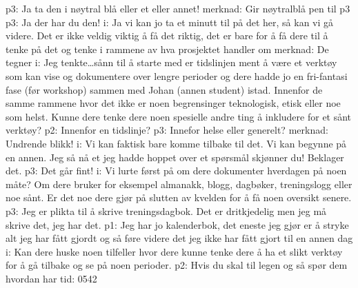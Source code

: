 \documentclass[11pt,UKenglish, a4paper]{article}
\begin{document}
p3: Ja ta den i nøytral blå eller et eller annet!
merknad: Gir nøytralblå pen til p3
p3: Ja der har du den!
i: Ja vi kan jo ta et minutt til på det her, så kan vi gå videre. Det er ikke veldig viktig å få det riktig, det er bare for å få dere til å tenke på det og tenke i rammene av hva prosjektet handler om
merknad: De tegner
i: Jeg tenkte\dots sånn til å starte med er tidslinjen ment å være et verktøy som kan vise og dokumentere over lengre perioder og dere hadde jo en fri-fantasi fase (før workshop) sammen med Johan (annen student) istad. Innenfor de samme rammene hvor det ikke er noen begrensinger teknologisk, etisk eller noe som helst. Kunne dere tenke dere noen spesielle andre ting å inkludere for et sånt verktøy? 
p2: Innenfor en tidslinje?
p3: Innefor helse eller generelt?
merknad: Undrende blikk!
i: Vi kan faktisk bare komme tilbake til det. Vi kan begynne på en annen. Jeg så nå et jeg hadde hoppet over et spørsmål skjønner du! Beklager det. 
p3: Det går fint!
i: Vi lurte først på om dere dokumenter hverdagen på noen måte? Om dere bruker for eksempel almanakk, blogg, dagbøker, treningslogg eller noe sånt. Er det noe dere gjør på slutten av kvelden for å få noen oversikt senere.
p3: Jeg er plikta til å skrive treningsdagbok. Det er dritkjedelig men jeg må skrive det, jeg har det.
p1: Jeg har jo kalenderbok, det eneste jeg gjør er å stryke alt jeg har fått gjordt og så føre videre det jeg ikke har fått gjort til en annen dag
i: Kan dere huske noen tilfeller hvor dere kunne tenke dere å ha et slikt verktøy for å gå tilbake og se på noen perioder.
p2: Hvis du skal til legen og så spør dem hvordan har
tid: 0542
\end{document}
